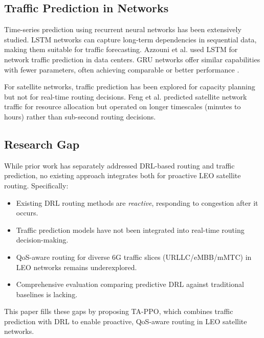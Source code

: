 \documentclass[journal]{IEEEtran}
\begin{document}
\subsection{Traffic Prediction in Networks}

Time-series prediction using recurrent neural networks has been extensively studied. LSTM networks \cite{hochreiter1997long} can capture long-term dependencies in sequential data, making them suitable for traffic forecasting. Azzouni et al. \cite{azzouni2017neutm} used LSTM for network traffic prediction in data centers. GRU networks \cite{cho2014learning} offer similar capabilities with fewer parameters, often achieving comparable or better performance \cite{chung2014empirical}.

For satellite networks, traffic prediction has been explored for capacity planning \cite{wang2019machine} but not for real-time routing decisions. Feng et al. \cite{feng2020deep} predicted satellite network traffic for resource allocation but operated on longer timescales (minutes to hours) rather than sub-second routing decisions.

\subsection{Research Gap}

While prior work has separately addressed DRL-based routing and traffic prediction, no existing approach integrates both for proactive LEO satellite routing. Specifically:

\begin{itemize}
\item Existing DRL routing methods are \textit{reactive}, responding to congestion after it occurs.
\item Traffic prediction models have not been integrated into real-time routing decision-making.
\item QoS-aware routing for diverse 6G traffic slices (URLLC/eMBB/mMTC) in LEO networks remains underexplored.
\item Comprehensive evaluation comparing predictive DRL against traditional baselines is lacking.
\end{itemize}

This paper fills these gaps by proposing TA-PPO, which combines traffic prediction with DRL to enable proactive, QoS-aware routing in LEO satellite networks.
\end{document}
